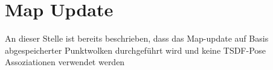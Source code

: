 \chapter{Map Update}
\label{chapter:map_update}

An dieser Stelle ist bereits beschrieben, dass das Map-update auf Basis abgespeicherter Punktwolken durchgeführt wird und keine TSDF-Pose Assoziationen verwendet werden

